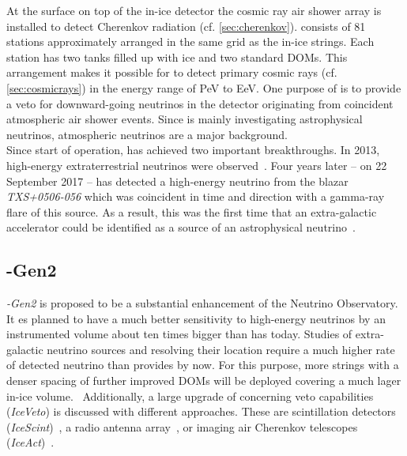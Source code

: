 At the surface on top of the in-ice detector the cosmic ray air shower array \icetop is installed to detect Cherenkov radiation (cf. \ref{sec:cherenkov}). \icetop consists of 81 stations approximately arranged in the same grid as the in-ice strings. Each station has two tanks filled up with ice and two standard \icecube DOMs. This arrangement makes it possible for \icetop to detect primary cosmic rays (cf. \ref{sec:cosmicrays}) in the energy range of \si{\peta\electronvolt} to \si{\exa\electronvolt}. One purpose of \icetop is to provide a veto for downward-going neutrinos in the \icecube detector originating from coincident atmospheric air shower events. \cite{icecube:instrumentation} Since \icecube is mainly investigating astrophysical neutrinos, atmospheric neutrinos are a major background.\\

Since start of operation, \icecube has achieved two important breakthroughs. In 2013, high-energy extraterrestrial neutrinos were observed~\cite{icecube:he_neutrino}. Four years later -- on \num{22} September 2017 -- \icecube has detected a high-energy neutrino from the blazar \textit{TXS+0506-056} which was coincident in time and direction with a gamma-ray flare of this source. As a result, this was the first time that an extra-galactic accelerator could be identified as a source of an astrophysical neutrino~\cite{icecube:txs}.

\subsection{\icecube-Gen2}

\textit{\icecube-Gen2} is proposed to be a substantial enhancement of the \icecube Neutrino Observatory. It es planned to have a much better sensitivity to high-energy neutrinos by an instrumented volume about ten times bigger than \icecube has today. Studies of extra-galactic neutrino sources and resolving their location require a much higher rate of detected neutrino than \icecube provides by now. For this purpose, more strings with a denser spacing of further improved DOMs will be deployed covering a much lager in-ice volume.~\cite{icecube:iceact,icecube:gen2} Additionally, a large upgrade of \icetop concerning veto capabilities (\textit{IceVeto}) is discussed with different approaches. These are scintillation detectors (\textit{IceScint})~\cite{icecube:gen2:icescint}, a radio antenna array~\cite{icecube:gen2:radio}, or imaging air Cherenkov telescopes (\textit{IceAct})~\cite{iacts:extension,icecube:iceact}.

